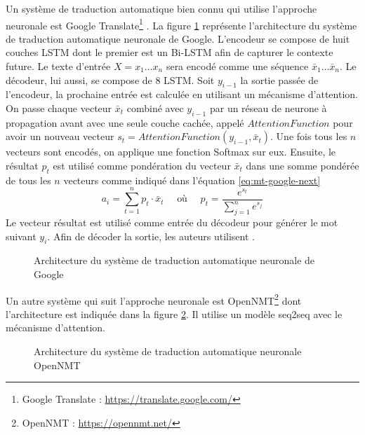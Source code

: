 \documentclass{KodeBook}
\begin{document}
Un système de traduction automatique bien connu qui utilise l'approche neuronale est Google Translate\footnote{Google Translate : \url{https://translate.google.com/}} \cite{2016-wu-al}.
La figure \ref{fig:mt-google} représente l'architecture du système de traduction automatique neuronale de Google. 
L'encodeur se compose de huit couches LSTM dont le premier est un Bi-LSTM afin de capturer le contexte future. 
Le texte d'entrée $X = x_1 \ldots x_n$ sera encodé comme une séquence $\bar{x}_1 \ldots \bar{x}_n$. 
Le décodeur, lui aussi, se compose de 8 LSTM.
Soit $y_{i-1}$ la sortie passée de l'encodeur, la prochaine entrée est calculée en utilisant un mécanisme d'attention. 
On passe chaque vecteur $\bar{x}_t$ combiné avec $y_{i-1}$ par un réseau de neurone à propagation avant avec une seule couche cachée, appelé $AttentionFunction$ pour avoir un nouveau vecteur $s_t = AttentionFunction(y_{i-1}, \bar{x}_t)$. 
Une fois tous les $n$ vecteurs sont encodés, on applique une fonction Softmax sur eux.
Ensuite, le résultat $p_t$ est utilisé comme pondération du vecteur $\bar{x}_t$ dans une somme pondérée de tous les $n$ vecteurs comme indiqué dans l'équation \ref{eq:mt-google-next}
\begin{equation}\label{eq:mt-google-next}
a_i = \sum_{t=1}^{n} p_t \cdot \bar{x}_t \quad \text{ où }\quad p_t = \frac{e^{s_t}}{\sum_{j=1}^n e^{s_j}}
\end{equation}
Le vecteur résultat est utilisé comme entrée du décodeur pour générer le mot suivant $y_i$.
Afin de décoder la sortie, les auteurs utilisent .

\begin{figure}[!ht]
	\centering
	\caption{Architecture du système de traduction automatique neuronale de Google \cite{2016-wu-al}}
	\label{fig:mt-google}
\end{figure}

Un autre système qui suit l'approche neuronale est OpenNMT\footnote{OpenNMT : \url{https://opennmt.net/}} \cite{17-klein-al} dont l'architecture est indiquée dans la figure \ref{fig:mt-opennmt}.
Il utilise un modèle seq2seq avec le mécanisme d'attention.

\begin{figure}[!ht]
	\centering
	\caption{Architecture du système de traduction automatique neuronale OpenNMT \cite{17-klein-al}}
	\label{fig:mt-opennmt}
\end{figure}


\end{document}
